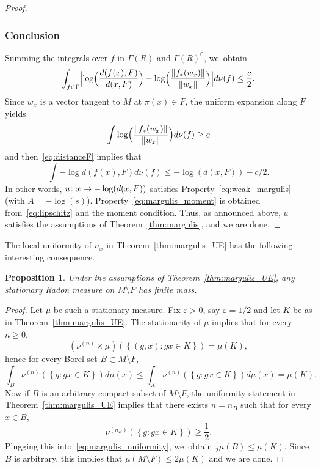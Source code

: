 \documentclass[11pt]{article}
\newcommand\mto{\mathchoice{\longmapsto}{\mapsto}{\mapsto}{\mapsto}}
\let\sep :
\let\e\varepsilon
\newcommand{\set}[1]{\left\{#1\right\}}
\newcommand{\norm}[1]{{\left\Vert#1\right\Vert}}
\newcommand{\Babs}[1]{\Bigl\vert#1\Bigr\vert}
\newcommand{\lrpar}[1]{\left(#1\right)}
\newcommand{\Blrpar}[1]{\Bigl(#1\Bigr)}
\theoremstyle{plain}
\newtheorem{pro}[thm]{Proposition}
\theoremstyle{definition}
\numberwithin{equation}{section}
\begin{document}
\begin{proof}
\subsubsection*{Conclusion}
Summing the integrals over $f$ in $\Gamma(R)$ and $\Gamma(R)^\complement$, we~obtain
\begin{equation}\label{eq:distanceF}
\int_{f\in \Gamma} \Babs{\log\Blrpar{\frac{d(f(x),F)}{d(x, F)}} - \log\Blrpar{\frac{\norm{f_\varstar (w_x)}}{\norm{w_x}}}} d\nu(f) \leq \frac{c}{2}.
\end{equation}
Since $w_x$ is a vector tangent to $M$ at $\pi(x)\in F$,
the uniform expansion along $F$ yields
\begin{equation*}\int \log\Blrpar{\frac{\norm{f_\varstar (w_x)}}{\norm{w_x}}} d\nu(f) \geq c
\end{equation*}
and
then~\eqref{eq:distanceF} implies that
\begin{equation*}
\int - \log {d(f(x),F)} d\nu(f) \leq - \log(d(x, F)) - c/2.
\end{equation*}
In other words, $u\colon x\mto -\log(d(x,F))$ satisfies Property~\eqref{eq:weak_margulis} (with $A=-\log(s)$). Property~\eqref{eq:margulis_moment} is obtained from~\eqref{eq:lipschitz} and the moment condition.
Thus, as announced above, $u$ satisfies the assumptions of Theorem~\ref{thm:margulis}, and we are done. \end{proof}

The local uniformity of $n_x$ in Theorem~\ref{thm:margulis_UE} has the following interesting consequence.

\begin{pro}\label{pro:finite_mass}
Under the assumptions of Theorem~\ref{thm:margulis_UE}, any stationary Radon measure on $M\setminus F$ has finite mass.
\end{pro}

\begin{proof}
Let $\mu$ be such a stationary measure. Fix $\e>0$, say $\e =1/2$ and
let $K$ be as in Theorem~\ref{thm:margulis_UE}. The stationarity of $\mu$ implies that for every $n\geq 0$,
\begin{equation*}
(\nu^{(n)}\times\mu)\lrpar{ \set{(g, x)\sep gx \in K}} = \mu(K),
\end{equation*}
hence for every Borel set $B\subset M\setminus F$,
\begin{equation}\label{eq:margulis_uniformity}
\int_B \nu^{(n)}\lrpar{\set{g\sep gx\in K}} d\mu(x) \leq \int_X \nu^{(n)}\lrpar{\set{g\sep gx\in K}} d\mu(x) = \mu(K).
\end{equation}
Now if $B$ is an arbitrary compact subset of $M\setminus F$, the uniformity statement in
Theorem~\ref{thm:margulis_UE} implies that there exists $n = n_B$ such that
for every $x\in B$,
\begin{equation*}
\nu^{(n_B)}\lrpar{\set{g\sep gx\in K}}\geq \frac12.
\end{equation*}
Plugging this into~\eqref{eq:margulis_uniformity}, we~obtain $\frac12 \mu(B) \leq \mu(K)$.
Since $B$ is arbitrary, this implies that $\mu(M\setminus F)\leq 2\mu(K)$ and we are done.
\end{proof}
\end{document}
